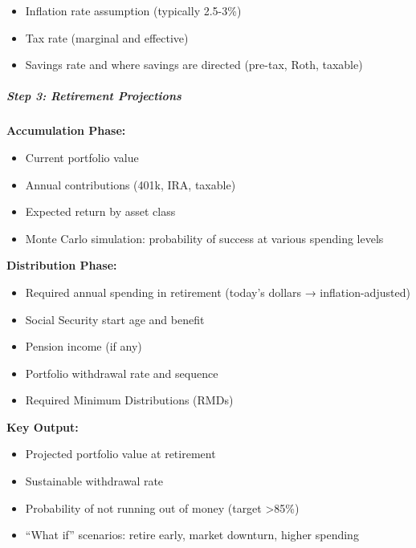 \documentclass[11pt]{article}
\begin{document}
\begin{itemize}[leftmargin=*,itemsep=2pt,topsep=2pt]
\item {} Inflation rate assumption (typically 2.5-3\%)
\item {} Tax rate (marginal and effective)
\item {} Savings rate and where savings are directed (pre-tax, Roth, taxable)
\end{itemize}

\subparagraph{Step 3: Retirement Projections}\mbox{}\par

\textbf{Accumulation Phase:}

\begin{itemize}[leftmargin=*,itemsep=2pt,topsep=2pt]
\item {} Current portfolio value
\item {} Annual contributions (401k, IRA, taxable)
\item {} Expected return by asset class
\item {} Monte Carlo simulation: probability of success at various spending levels
\end{itemize}

\textbf{Distribution Phase:}

\begin{itemize}[leftmargin=*,itemsep=2pt,topsep=2pt]
\item {} Required annual spending in retirement (today's dollars → inflation-adjusted)
\item {} Social Security start age and benefit
\item {} Pension income (if any)
\item {} Portfolio withdrawal rate and sequence
\item {} Required Minimum Distributions (RMDs)
\end{itemize}

\textbf{Key Output:}

\begin{itemize}[leftmargin=*,itemsep=2pt,topsep=2pt]
\item {} Projected portfolio value at retirement
\item {} Sustainable withdrawal rate
\item {} Probability of not running out of money (target >85\%)
\item {} ``What if'' scenarios: retire early, market downturn, higher spending
\end{itemize}
\end{document}
